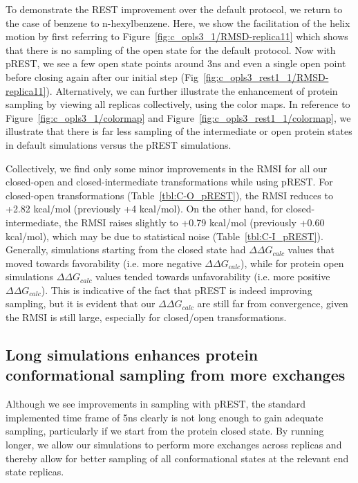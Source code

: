 \documentclass[journal=jctcce,manuscript=article]{achemso}
\begin{document}
To demonstrate the REST improvement over the default protocol, we return to the case of benzene to n-hexylbenzene.
Here, we show the facilitation of the helix motion by first referring to Figure~\ref{fig:c_opls3_1/RMSD-replica11} which shows that there is no sampling of the open state for the default protocol.
Now with pREST, we see a few open state points around 3ns and even a single open point before closing again after our initial step (Fig~\ref{fig:c_opls3_rest1_1/RMSD-replica11}).
Alternatively, we can further illustrate the enhancement of protein sampling by viewing all replicas collectively, using the color maps.
In reference to Figure~\ref{fig:c_opls3_1/colormap} and Figure~\ref{fig:c_opls3_rest1_1/colormap}, we illustrate that there is far less sampling of the intermediate or open protein states in default simulations versus the pREST simulations.
 
Collectively, we find only some minor improvements in the RMSI for all our closed-open and closed-intermediate transformations while using pREST. 
For closed-open transformations (Table~\ref{tbl:C-O_pREST}), the RMSI reduces to +2.82 kcal/mol (previously +4 kcal/mol). 
On the other hand, for closed-intermediate, the RMSI raises slightly to +0.79 kcal/mol (previously +0.60 kcal/mol), which may be due to statistical noise (Table~\ref{tbl:C-I_pREST}).
Generally, simulations starting from the closed state had $\Delta\Delta G_{calc}$ values that moved towards favorability (i.e. more negative $\Delta\Delta G_{calc}$), while for protein open simulations $\Delta\Delta G_{calc}$ values tended towards unfavorability (i.e. more positive $\Delta\Delta G_{calc}$).
This is indicative of the fact that pREST is indeed improving sampling, but it is evident that our $\Delta\Delta G_{calc}$ are still far from convergence, given the RMSI is still large, especially for closed/open transformations.

\subsection*{Long simulations enhances protein conformational sampling from more exchanges}
Although we see improvements in sampling with pREST, the standard implemented time frame of 5ns clearly is not long enough to gain adequate sampling, particularly if we start from the protein closed state.
By running longer, we allow our simulations to perform more exchanges across replicas and thereby allow for better sampling of all conformational states at the relevant end state replicas.
\end{document}
